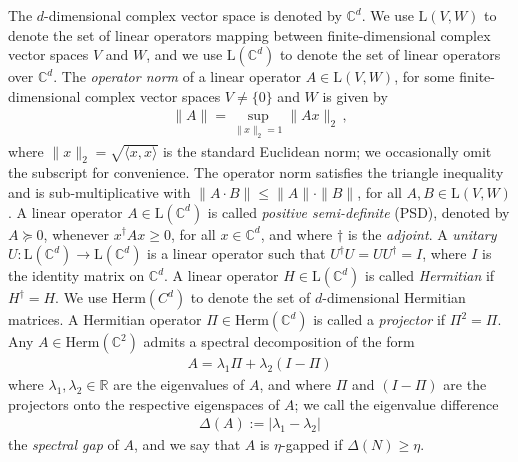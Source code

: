 \documentclass[11pt]{article}
\theoremstyle{plain}
\begin{document}
The $d$-dimensional complex vector space is denoted by $\mathbb{C}^d$. We use $\mathrm{L}(V,W)$ to denote the set of linear operators mapping between finite-dimensional complex vector spaces $V$ and $W$, and we use
$\mathrm{L}(\mathbb{C}^d)$ to denote the set of linear operators over $\mathbb{C}^d$. The \emph{operator norm} of a linear operator $A \in \mathrm{L}(V,W)$, for some finite-dimensional complex vector spaces $V \neq \{0\}$ and $W$ is given by
\begin{align}
\|A \| = \sup_{\|x\|_2 =1} \|A x\|_2 \, ,    
\end{align}
where $\|x \|_2 = \sqrt{\langle x,x \rangle}$ is the standard Euclidean norm; we occasionally omit the subscript for convenience. The operator norm satisfies the triangle inequality and is sub-multiplicative with $\|A \cdot B\| \leq \|A\| \cdot \|B\|$, for all $A,B \in \mathrm{L}(V,W)$.
A linear operator $A \in \mathrm{L}(\mathbb{C}^d)$ is called \emph{positive semi-definite} (PSD), denoted by $A \succeq 0$, whenever $x^\dag A x \geq 0$, for all $x \in \mathbb{C}^d$, and where $\dag$ is the \emph{adjoint}.
A \emph{unitary} $U: \mathrm{L} (\mathbb{C}^d) \to \mathrm{L}(\mathbb{C}^d)$ is a linear operator such that $U^\dagger U = U U^\dagger = I$, where $I$ is the identity matrix on $\mathbb{C}^d$. 
A linear operator $H \in \mathrm{L}(\mathbb{C}^d)$ is called \emph{Hermitian} if $H^\dag = H$. We use $\mathrm{Herm}(C^{d})$ to denote the set of $d$-dimensional Hermitian matrices. 
A Hermitian operator $\Pi \in \mathrm{Herm}(\mathbb{C}^{d})$ is called a \emph{projector} if $\Pi^2=\Pi$. Any $A \in \mathrm{Herm}(\mathbb{C}^{2})$ admits a spectral decomposition of the form 
\begin{align}
 A = \lambda_1 \Pi + \lambda_2 (I -\Pi)   
\end{align}
where $\lambda_1,\lambda_2 \in \mathbb{R}$ are the eigenvalues of $A$, and where $\Pi$ and $(I-\Pi)$ are the projectors onto the respective eigenspaces of $A$; we call the eigenvalue difference
\begin{align}
\Delta(A) := |\lambda_1 - \lambda_2|   
\end{align}
the \emph{spectral gap} of $A$, and we say that $A$ is
$\eta$-gapped if $\Delta(N) \geq \eta$.
\end{document}
